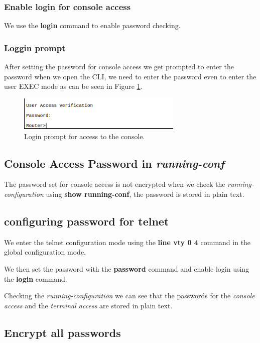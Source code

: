 \documentclass{article}
\begin{document}
\subsubsection{Enable login for console access}
We use the \textbf{login} command to enable password checking. 

\subsubsection{Loggin prompt}
After setting the password for console access we get prompted to enter the password when we open the CLI, we need to enter the password even to enter the user EXEC mode as can be seen in Figure \ref{fig:logincon}.

\begin{figure}[h]
    \centering
    \includegraphics[width=0.7\textwidth]{imgs/logincon}
    \caption{Login prompt for access to the console.}
    \label{fig:logincon}
\end{figure}

\subsection{Console Access Password in \emph{running-conf}}

The password set for console access is not encrypted when we check the \textit{running-configuration} using \textbf{show running-conf}, the password is stored in plain text. 

\subsection{configuring password for telnet}


We enter the telnet configuration mode using the \textbf{line vty 0 4} command in the global configuration mode.


We then set the password with the \textbf{password} command and enable login using the \textbf{login} command. 

Checking the \textit{running-configuration} we can see that the passwords for the \textit{console access} and the \textit{terminal access} are stored in plain text.

\subsection{Encrypt all passwords}
\end{document}
